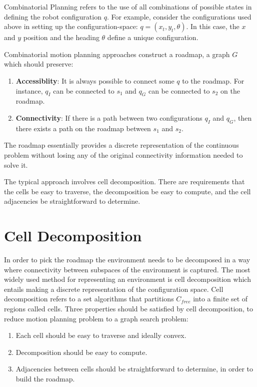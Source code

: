 \documentclass[twoside]{article}
\begin{document}
Combinatorial Planning refers to the use of all combinations of possible states in defining the robot configuration $q$. For example, consider the configurations used above in setting up the configuration-space: $q = (x_t, y_t, \theta)$. In this case, the $x$ and $y$ position and the heading $\theta$ define a unique configuration.

Combinatorial motion planning approaches construct a roadmap, a graph $G$ which should preserve:

\begin{enumerate}
	\item \textbf{Accessiblity}: It is always possible to connect some $q$ to the roadmap. For instance, $q_I$ can be connected to $s_1$ and $q_G$ can be connected to $s_2$ on the roadmap.
	\item \textbf{Connectivity}: If there is a path between two configurations $q_I$ and $q_G$, then there exists a path on the roadmap between $s_1$ and $s_2$.
\end{enumerate}

The roadmap essentially provides a discrete representation of the continuous problem without losing any of the original connectivity information needed to solve it.

The typical approach involves cell decomposition. There are requirements that the cells be easy to traverse, the decomposition be easy to compute, and the cell adjacencies be straightforward to determine.

\section{Cell Decomposition}
In order to pick the roadmap the environment needs to be decomposed in a way where connectivity between subspaces of the environment is captured. The most widely used method for representing an environment is cell decomposition which entails making a discrete representation of the configuration space. Cell decomposition refers to a set algorithms that partitions $C_{free}$ into a finite set of regions called cells. Three properties should be satisfied by cell decomposition, to reduce motion planning problem to a graph search problem:

\begin{enumerate}
\item Each cell should be easy to traverse and ideally convex.
\item Decomposition should be easy to compute.
\item Adjacencies between cells should be straightforward to determine, in order to build the roadmap.
\end{enumerate}
\end{document}
